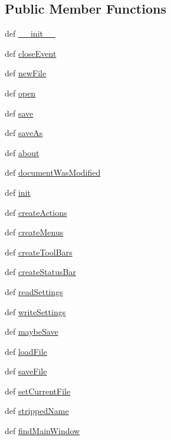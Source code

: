 \subsection*{Public Member Functions}
\begin{DoxyCompactItemize}
\item 
def \hyperlink{classsdi_1_1MainWindow_a4480654576b4216d25bd83b5f3edd54d}{\+\_\+\+\_\+init\+\_\+\+\_\+}
\item 
def \hyperlink{classsdi_1_1MainWindow_a6575b5e42781a385c23b7860216e09c0}{close\+Event}
\item 
def \hyperlink{classsdi_1_1MainWindow_adab9be7771ceeb093f2ab4f39df2f17d}{new\+File}
\item 
def \hyperlink{classsdi_1_1MainWindow_adf1eb6f09fe7c2d1943ebb2789b86fc1}{open}
\item 
def \hyperlink{classsdi_1_1MainWindow_a753707c9084379eea630495579bb3688}{save}
\item 
def \hyperlink{classsdi_1_1MainWindow_a5695a5d3c2e64cb38e23bec9bfa1680f}{save\+As}
\item 
def \hyperlink{classsdi_1_1MainWindow_ab50b3222af522a0644ccf27b6ffbef3c}{about}
\item 
def \hyperlink{classsdi_1_1MainWindow_abede772190ecfd8a41320893ce1b8692}{document\+Was\+Modified}
\item 
def \hyperlink{classsdi_1_1MainWindow_aaf1d286a77571cd0e2f1f7998586a857}{init}
\item 
def \hyperlink{classsdi_1_1MainWindow_a6ea08c2df15f56a69bbd7132f5b36ee0}{create\+Actions}
\item 
def \hyperlink{classsdi_1_1MainWindow_a17bae47e407813bcc2b8df0ec8731325}{create\+Menus}
\item 
def \hyperlink{classsdi_1_1MainWindow_a7321a3f3bf2c23f39a05a27d0f5da52b}{create\+Tool\+Bars}
\item 
def \hyperlink{classsdi_1_1MainWindow_ae818d46cd7bbd163ce227d0d0d4cc2d8}{create\+Status\+Bar}
\item 
def \hyperlink{classsdi_1_1MainWindow_abdacf92d31e184334f41c6c7484b0bee}{read\+Settings}
\item 
def \hyperlink{classsdi_1_1MainWindow_affa389870987662d47beeeafdb6e9d82}{write\+Settings}
\item 
def \hyperlink{classsdi_1_1MainWindow_adb45c14bbf224603a9b7437bf945596a}{maybe\+Save}
\item 
def \hyperlink{classsdi_1_1MainWindow_a06be7e6cafc1b96febea0260cd2ded48}{load\+File}
\item 
def \hyperlink{classsdi_1_1MainWindow_ad49b00d809e182eb89a8bf72e3127290}{save\+File}
\item 
def \hyperlink{classsdi_1_1MainWindow_ac93b82ab76b4f6454869a5bdbeaac046}{set\+Current\+File}
\item 
def \hyperlink{classsdi_1_1MainWindow_addd9ad8a76aec6591dd8f5dba3102bd7}{stripped\+Name}
\item 
def \hyperlink{classsdi_1_1MainWindow_af09d38771303fb6eaee924b6e3edd497}{find\+Main\+Window}
\end{DoxyCompactItemize}

